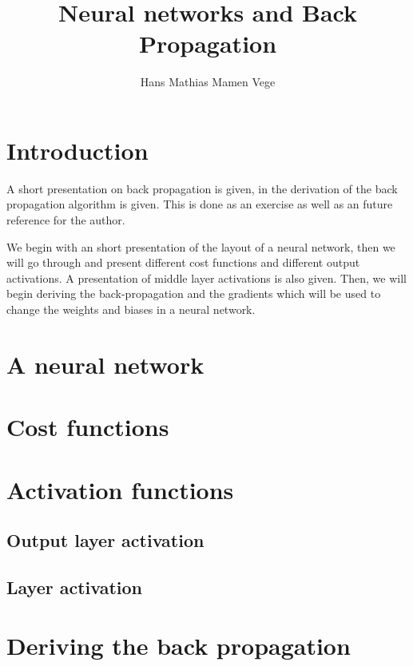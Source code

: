 \documentclass[a4paper,10pt]{article}
\title{Neural networks and Back Propagation}
\author{Hans Mathias Mamen Vege}
\begin{document}
\maketitle

\section{Introduction}
A short presentation on back propagation is given, in the derivation of the back propagation algorithm is given. This is done as an exercise as well as an future reference for the author.

We begin with an short presentation of the layout of a neural network, then we will go through and present different cost functions and different output activations. A presentation of middle layer activations is also given. Then, we will begin deriving the back-propagation and the gradients which will be used to change the weights and biases in a neural network.

\section{A neural network}

\section{Cost functions}

\section{Activation functions}

\subsection{Output layer activation}
\subsection{Layer activation}

\section{Deriving the back propagation}

\end{document}
